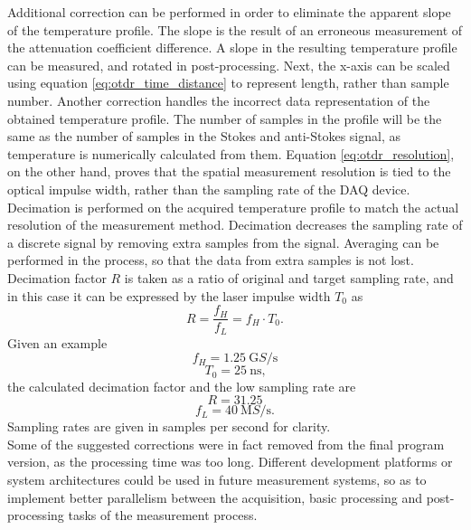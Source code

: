 \documentclass{standalone}
\begin{document}
Additional correction can be performed in order to eliminate the apparent slope of the temperature profile. The slope is the result of an erroneous measurement of the attenuation coefficient difference. A slope in the resulting temperature profile can be measured, and rotated in post-processing. Next, the x-axis can be scaled using equation \ref{eq:otdr_time_distance} to represent length, rather than sample number. Another correction handles the incorrect data representation of the obtained temperature profile. The number of samples in the profile will be the same as the number of samples in the Stokes and anti-Stokes signal, as temperature is numerically calculated from them. Equation \ref{eq:otdr_resolution}, on the other hand, proves that the spatial measurement resolution is tied to the optical impulse width, rather than the sampling rate of the DAQ device. Decimation is performed on the acquired temperature profile to match the actual resolution of the measurement method. Decimation decreases the sampling rate of a discrete signal by removing extra samples from the signal. Averaging can be performed in the process, so that the data from extra samples is not lost. Decimation factor $R$ is taken as a ratio of original and target sampling rate, and in this case it can be expressed by the laser impulse width $T_0$ as
\begin{equation}
R = \frac{f_H}{f_L} = f_H \cdot T_0 \textrm{.}
\end{equation}
Given an example
\begin{equation}
f_H = \SI{1.25}{\giga S / \second}
\end{equation}
\begin{equation}
T_0 = \SI{25}{\nano \second} \textrm{,}
\end{equation}
the calculated decimation factor and the low sampling rate are
\begin{equation}
R = 31.25
\end{equation}
\begin{equation}
f_L = \SI{40}{\mega S / \second} \textrm{.}
\end{equation}
Sampling rates are given in samples per second for clarity. \\

Some of the suggested corrections were in fact removed from the final program version, as the processing time was too long. Different development platforms or system architectures could be used in future measurement systems, so as to implement better parallelism between the acquisition, basic processing and post-processing tasks of the measurement process.
\end{document}
